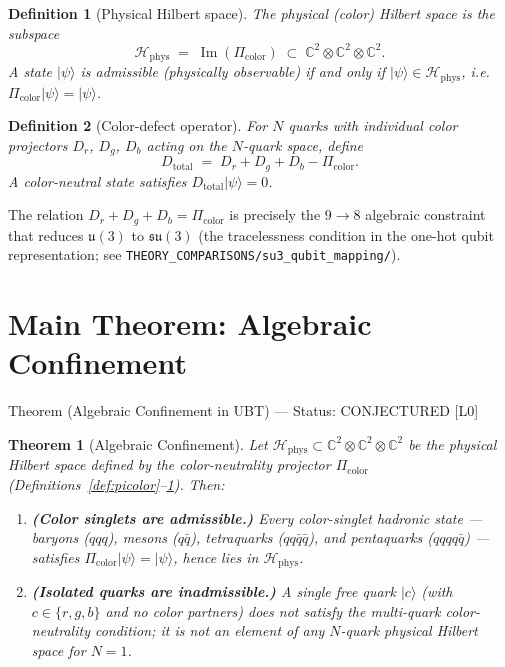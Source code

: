 \documentclass[12pt,a4paper]{article}
\newtheorem{theorem}{Theorem}
\newtheorem{definition}{Definition}
\newcommand{\Hphys}{\mathcal{H}_{\mathrm{phys}}}
\newcommand{\Picolor}{\Pi_{\mathrm{color}}}
\newcommand{\Dtotal}{D_{\mathrm{total}}}
\newcommand{\CCC}{\mathbb{C}}
\newcommand{\ket}[1]{|#1\rangle}
\begin{document}
\begin{definition}[Physical Hilbert space]
\label{def:hphys}
The \emph{physical (color) Hilbert space} is the subspace
\begin{equation}
  \Hphys \;=\; \operatorname{Im}(\Picolor)
  \;\subset\; \CCC^2 \otimes \CCC^2 \otimes \CCC^2 .
\end{equation}
A state $\ket{\psi}$ is \emph{admissible} (physically observable) if and only if
$\ket{\psi} \in \Hphys$, i.e.\ $\Picolor \ket{\psi} = \ket{\psi}$.
\end{definition}

\begin{definition}[Color-defect operator]
\label{def:dtotal}
For $N$ quarks with individual color projectors $D_r$, $D_g$, $D_b$ acting on
the $N$-quark space, define
\begin{equation}
  \Dtotal \;=\; D_r + D_g + D_b - \Picolor .
\end{equation}
A color-neutral state satisfies $\Dtotal\ket{\psi} = 0$.
\end{definition}

The relation $D_r + D_g + D_b = \Picolor$ is precisely the $9 \to 8$ algebraic
constraint that reduces $\mathfrak{u}(3)$ to $\mathfrak{su}(3)$ (the tracelessness
condition in the one-hot qubit representation; see
\texttt{THEORY\_COMPARISONS/su3\_qubit\_mapping/}).

\section{Main Theorem: Algebraic Confinement}
\label{sec:theorem}

\begin{theorembox}{Theorem (Algebraic Confinement in UBT) — Status: CONJECTURED [L0]}
\begin{theorem}[Algebraic Confinement]
\label{thm:confinement}
Let $\Hphys \subset \CCC^2 \otimes \CCC^2 \otimes \CCC^2$ be the physical
Hilbert space defined by the color-neutrality projector $\Picolor$
(Definitions~\ref{def:picolor}–\ref{def:hphys}).  Then:
\begin{enumerate}
  \item \textbf{(Color singlets are admissible.)} Every color-singlet hadronic
    state — baryons ($qqq$), mesons ($q\bar q$), tetraquarks ($qq\bar q\bar q$),
    and pentaquarks ($qqqq\bar q$) — satisfies $\Picolor\ket{\psi} = \ket{\psi}$,
    hence lies in $\Hphys$.
  \item \textbf{(Isolated quarks are inadmissible.)} A single free quark
    $\ket{c}$ (with $c \in \{r,g,b\}$ and no color partners) does \emph{not}
    satisfy the multi-quark color-neutrality condition; it is \emph{not} an
    element of any $N$-quark physical Hilbert space for $N = 1$.
\end{enumerate}
\end{theorem}
\end{theorembox}
\end{document}
